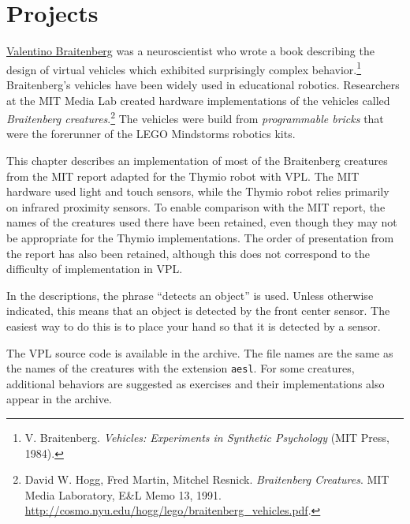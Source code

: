 
\part{Projects}

\label{ch.brait}


\href{http://en.wikipedia.org/wiki/Valentino_Braitenberg}{Valentino
Braitenberg} was a neuroscientist who wrote a book describing
the design of virtual vehicles which exhibited surprisingly complex
behavior.\footnote{V. Braitenberg. \textit{Vehicles: Experiments in
Synthetic Psychology} (MIT Press, 1984).} Braitenberg's vehicles have
been widely used in educational robotics. Researchers at the MIT Media
Lab created hardware implementations of the vehicles called
\emph{Braitenberg creatures}.\footnote{David W. Hogg, Fred Martin,
Mitchel Resnick. \textit{Braitenberg Creatures}. MIT Media Laboratory,
E\&L Memo 13, 1991.
\href{http://cosmo.nyu.edu/hogg/lego/braitenberg_vehicles.pdf}{http://cosmo.nyu.edu/hogg/lego/braitenberg\_vehicles.pdf}.} The
vehicles were build from \emph{programmable bricks} that were the
forerunner of the LEGO Mindstorms robotics kits.

This chapter describes an implementation of most of the Braitenberg
creatures from the MIT report adapted for the Thymio robot with VPL. The
MIT hardware used light and touch sensors, while the Thymio robot relies
primarily on infrared proximity sensors. To enable comparison with the
MIT report, the names of the creatures used there have been retained,
even though they may not be appropriate for the Thymio implementations.
The order of presentation from the report has also been retained,
although this does not correspond to the difficulty of implementation
in VPL.

In the descriptions, the phrase ``detects an object'' is used. Unless
otherwise indicated, this means that an object is detected by the front
center sensor. The easiest way to do this is to place your hand
so that it is detected by a sensor.

The \textsc{VPL} source code is available in the archive. The file names
are the same as the names of the creatures with the extension
\texttt{\small aesl}. For some creatures, additional behaviors are
suggested as exercises and their implementations also appear in the
archive.


